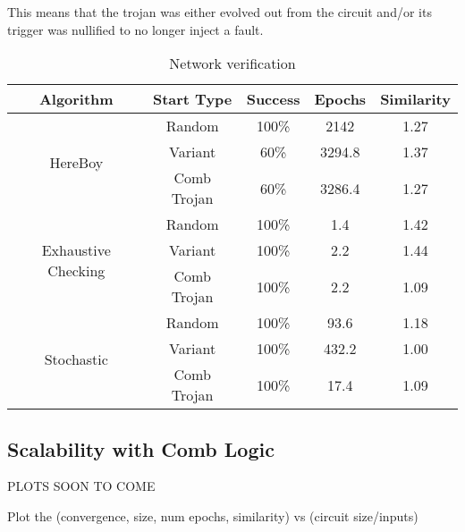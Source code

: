 \documentclass[conference]{IEEEtran}
\begin{document}
{This means that the trojan was either evolved out from the circuit and/or its trigger was nullified to no longer inject a fault.
\begin{table}
    \begin{tabular}{|| c | c | c | c | c||}
         \hline
         Algorithm & Start Type & Success & Epochs & Similarity \\ [0.5ex] 
         \hline\hline
         \hline
         \multirow{3}{5em}{HereBoy} 
         & Random  & 100\% & 2142 & 1.27 \\ 
         & Variant & 60\% & 3294.8 & 1.37 \\
         & Comb Trojan & 60\% & 3286.4 & 1.27 \\
         \hline  
         \multirow{3}{5em}{Exhaustive Checking} 
         & Random  & 100\% & 1.4 & 1.42\\ 
         & Variant & 100\% & 2.2 & 1.44 \\
         & Comb Trojan & 100\% & 2.2 & 1.09 \\
         \hline  
         \multirow{3}{5em}{Stochastic} 
         & Random  & 100\% & 93.6 & 1.18 \\ 
         & Variant & 100\% & 432.2 & 1.00 \\
         & Comb Trojan & 100\% & 17.4 & 1.09 \\
        \hline
    \end{tabular}
    \caption{Network verification}
    \label{tbl:basic_results}
\end{table}

\subsection{Scalability with Comb Logic}
\par PLOTS SOON TO COME
\par Plot the (convergence, size, num epochs, similarity) vs (circuit size/inputs)

}
\end{document}
